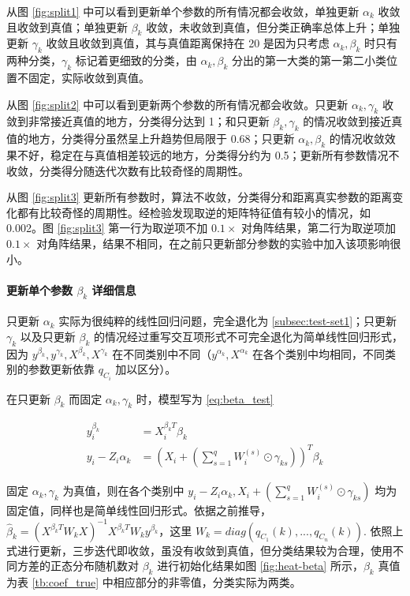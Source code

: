 \documentclass[12pt, a4paper, oneside]{article}
\numberwithin{equation}{section}
\begin{document}
从图 \ref{fig:split1} 中可以看到更新单个参数的所有情况都会收敛，单独更新 $\alpha_k$ 收敛且收敛到真值；单独更新 $\beta_k$ 收敛，未收敛到真值，但分类正确率总体上升；单独更新 $\gamma_k$ 收敛且收敛到真值，其与真值距离保持在 20 是因为只考虑 $\alpha_k, \beta_k$ 时只有两种分类，$\gamma_k$ 标记着更细致的分类，由 $\alpha_k, \beta_k$ 分出的第一大类的第一第二小类位置不固定，实际收敛到真值。

从图 \ref{fig:split2} 中可以看到更新两个参数的所有情况都会收敛。只更新 $\alpha_k, \gamma_k$ 收敛到非常接近真值的地方，分类得分达到 1；和只更新 $\beta_k, \gamma_k$ 的情况收敛到接近真值的地方，分类得分虽然呈上升趋势但局限于 0.68；只更新 $\alpha_k, \beta_k$ 的情况收敛效果不好，稳定在与真值相差较远的地方，分类得分约为 0.5；更新所有参数情况不收敛，分类得分随迭代次数有比较奇怪的周期性。

从图 \ref{fig:split3} 更新所有参数时，算法不收敛，分类得分和距离真实参数的距离变化都有比较奇怪的周期性。经检验发现取逆的矩阵特征值有较小的情况，如 0.002。图 \ref{fig:split3} 第一行为取逆项不加 $0.1 \times$ 对角阵结果，第二行为取逆项加 $0.1 \times$ 对角阵结果，结果不相同，在之前只更新部分参数的实验中加入该项影响很小。


\paragraph{更新单个参数 $\beta_k$ 详细信息}

只更新 $\alpha_k$ 实际为很纯粹的线性回归问题，完全退化为 \ref{subsec:test-set1}；只更新 $\gamma_k$ 以及只更新 $\beta_k$ 的情况经过重写交互项形式不可完全退化为简单线性回归形式，因为 $y^{\beta_k}, y^{\gamma_k}, X^{\beta_k}, X^{\gamma_k}$ 在不同类别中不同（$y^{\alpha_k}, X^{\alpha_k}$ 在各个类别中均相同，不同类别的参数更新依靠 $q_{C_i}$ 加以区分）。

在只更新 $\beta_k$ 而固定 $\alpha_k, \gamma_k$ 时，模型写为 \ref{eq:beta_test}

\begin{equation}
	\begin{aligned}
		y_i^{\beta_k} &= X_i^{\beta_k T} \beta_k \\
		y_i - Z_i \alpha_k &= \left(X_i + (\sum_{s=1}^{q}W_i^{(s)}\odot\gamma_{ks}) \right)^T \beta_k
	\end{aligned}
\label{eq:beta_test}
\end{equation} 

固定 $\alpha_k, \gamma_k$ 为真值，则在各个类别中 $y_i - Z_i \alpha_k, X_i + (\sum_{s=1}^{q}W_i^{(s)}\odot\gamma_{ks})$ 均为固定值，同样也是简单线性回归形式。依据之前推导，$\hat{\beta}_{k} = (X^{\beta_k T} W_k X)^{-1} X^{\beta_k T} W_k y^{\beta_k}$，这里 $W_k = diag(q_{C_1}(k),...,q_{C_n}(k))$. 依照上式进行更新，三步迭代即收敛，虽没有收敛到真值，但分类结果较为合理，使用不同方差的正态分布随机数对 $\beta_k$ 进行初始化结果如图 \ref{fig:heat-beta} 所示，$\beta_k$ 真值为表 \ref{tb:coef_true} 中相应部分的非零值，分类实际为两类。
\end{document}
